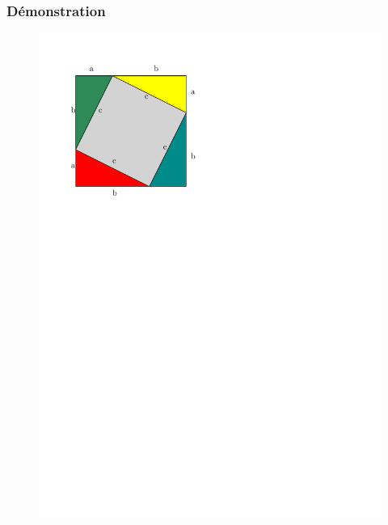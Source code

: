 \documentclass{beamer}
\begin{document}
\begin{frame}
  \frametitle{Démonstration}
 	\begin{figure}[H]
	  \centering
	  \includegraphics[width=0.65\linewidth]{sources/1/demo-pytha-t4.pdf}
	\end{figure}
\end{frame}
\end{document}
